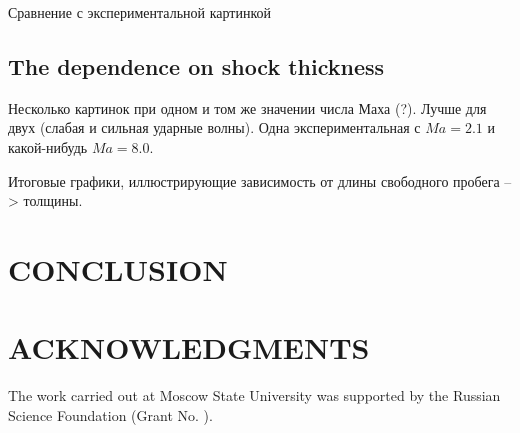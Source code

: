 \documentclass{aip-cp}
\begin{document}
Сравнение с экспериментальной картинкой 

\subsection{The dependence on shock thickness}

Несколько картинок при одном и том же значении числа Маха (?). Лучше для двух (слабая и сильная ударные волны). Одна экспериментальная с $Ma=2.1$ и какой-нибудь $Ma=8.0$.

Итоговые графики, иллюстрирующие зависимость от длины свободного пробега --> толщины.

\section{CONCLUSION}

\section{ACKNOWLEDGMENTS}
The work carried out at Moscow State University was supported by the Russian Science Foundation (Grant No. ).


\nocite{*}
%
%
\end{document}
